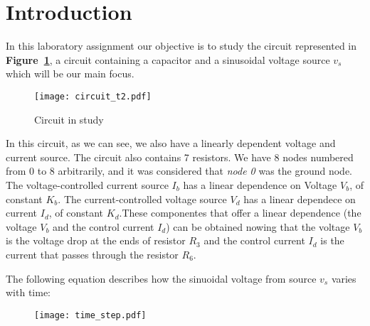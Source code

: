 \section{Introduction}
\label{sec:introduction}

In this laboratory assignment our objective is to study  the circuit represented in \textbf{Figure~\ref{fig:circuit_t2}}, a circuit containing a capacitor and a sinusoidal voltage source $v_s$ which will be our main focus.

\begin{figure}[h] \centering
\texttt{[image: circuit\_t2.pdf]}
\caption{Circuit in study}
\label{fig:circuit_t2}
\end{figure}


\par In this circuit, as we can see, we also have a linearly dependent voltage and current source. The circuit also contains 7 resistors.
We have 8 nodes numbered from 0 to 8 arbitrarily, and it was considered that {\it node 0} was the ground node. The voltage-controlled current source {\it $I_b$} has a linear dependence on Voltage {\it $V_b$}, of constant {\it $K_b$}. The current-controlled voltage source {\it $V_d$} has a linear dependece on current {\it $I_d$}, of constant {\it $K_d$}.These componentes that offer a linear dependence (the voltage {\it $V_b$} and the control current {\it $I_d$}) can be obtained nowing that the voltage {\it $V_b$} is the voltage drop at the ends of resistor {\it $R_3$} and the control current {\it $I_d$} is the current that passes through the resistor {\it $R_6$}.\par 
The following equation describes how the sinuoidal voltage from source $v_s$ varies with time:

\begin{figure}[h] \centering
\texttt{[image: time\_step.pdf]}
\label{fig:time_step}
\end{figure}



